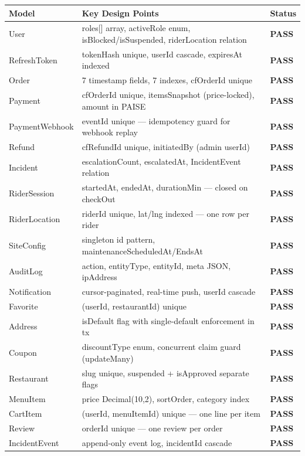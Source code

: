 \documentclass[11pt,a4paper]{article}
\newcommand{\PASS}{\colorbox{successgreen!20}{\color{successgreen}\bfseries\small PASS}}
\begin{document}
\begin{tabularx}{\textwidth}{@{}p{3cm}Xp{2.2cm}@{}}
\toprule
\rowcolor{navyblue}\color{white}\bfseries Model & \color{white}\bfseries Key Design Points & \color{white}\bfseries Status \\
\midrule
User            & roles[] array, activeRole enum, isBlocked/isSuspended, riderLocation relation & \PASS \\
\rowcolor{rowalt}
RefreshToken    & tokenHash unique, userId cascade, expiresAt indexed & \PASS \\
Order           & 7 timestamp fields, 7 indexes, cfOrderId unique & \PASS \\
\rowcolor{rowalt}
Payment         & cfOrderId unique, itemsSnapshot (price-locked), amount in PAISE & \PASS \\
PaymentWebhook  & eventId unique — idempotency guard for webhook replay & \PASS \\
\rowcolor{rowalt}
Refund          & cfRefundId unique, initiatedBy (admin userId) & \PASS \\
Incident        & escalationCount, escalatedAt, IncidentEvent relation & \PASS \\
\rowcolor{rowalt}
RiderSession    & startedAt, endedAt, durationMin — closed on checkOut & \PASS \\
RiderLocation   & riderId unique, lat/lng indexed — one row per rider & \PASS \\
\rowcolor{rowalt}
SiteConfig      & singleton id pattern, maintenanceScheduledAt/EndsAt & \PASS \\
AuditLog        & action, entityType, entityId, meta JSON, ipAddress & \PASS \\
\rowcolor{rowalt}
Notification    & cursor-paginated, real-time push, userId cascade & \PASS \\
Favorite        & (userId, restaurantId) unique & \PASS \\
\rowcolor{rowalt}
Address         & isDefault flag with single-default enforcement in tx & \PASS \\
Coupon          & discountType enum, concurrent claim guard (updateMany) & \PASS \\
\rowcolor{rowalt}
Restaurant      & slug unique, suspended + isApproved separate flags & \PASS \\
MenuItem        & price Decimal(10,2), sortOrder, category index & \PASS \\
\rowcolor{rowalt}
CartItem        & (userId, menuItemId) unique — one line per item & \PASS \\
Review          & orderId unique — one review per order & \PASS \\
\rowcolor{rowalt}
IncidentEvent   & append-only event log, incidentId cascade & \PASS \\
\bottomrule
\end{tabularx}
\end{document}
